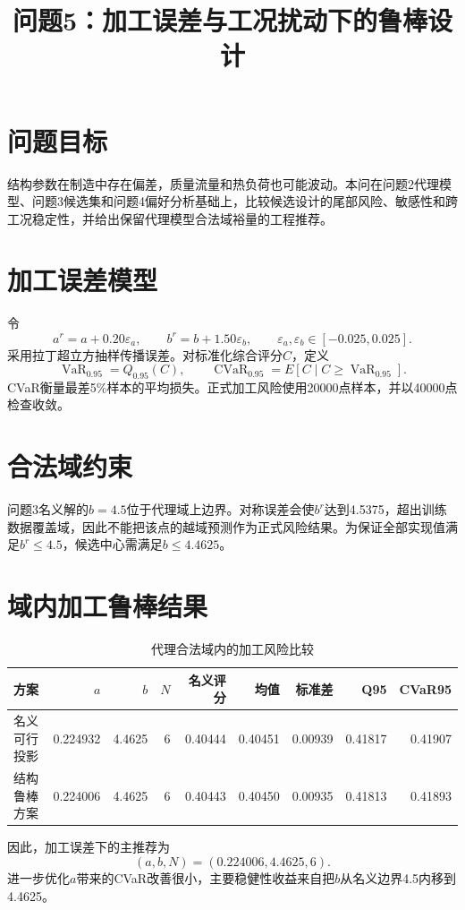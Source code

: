 \documentclass[UTF8,11pt,a4paper]{ctexart}
\title{问题5：加工误差与工况扰动下的鲁棒设计}
\author{}\date{}
\begin{document}
\maketitle

\section{问题目标}
结构参数在制造中存在偏差，质量流量和热负荷也可能波动。本问在问题2代理模型、问题3候选集和问题4偏好分析基础上，比较候选设计的尾部风险、敏感性和跨工况稳定性，并给出保留代理模型合法域裕量的工程推荐。

\section{加工误差模型}
令
\[
a^r=a+0.20\varepsilon_a,\qquad b^r=b+1.50\varepsilon_b,
\qquad \varepsilon_a,\varepsilon_b\in[-0.025,0.025].
\]
采用拉丁超立方抽样传播误差。对标准化综合评分$C$，定义
\[
\operatorname{VaR}_{0.95}=Q_{0.95}(C),\qquad
\operatorname{CVaR}_{0.95}=E[C\mid C\ge\operatorname{VaR}_{0.95}].
\]
CVaR衡量最差5\%样本的平均损失。正式加工风险使用20000点样本，并以40000点检查收敛。

\section{合法域约束}
问题3名义解的$b=4.5$位于代理域上边界。对称误差会使$b^r$达到4.5375，超出训练数据覆盖域，因此不能把该点的越域预测作为正式风险结果。为保证全部实现值满足$b^r\le4.5$，候选中心需满足$b\le4.4625$。

\section{域内加工鲁棒结果}
\begin{table}[H]\centering\small
\caption{代理合法域内的加工风险比较}
\begin{tabular}{lrrrrrrrr}\toprule
方案&$a$&$b$&$N$&名义评分&均值&标准差&Q95&CVaR95\\\midrule
名义可行投影&0.224932&4.4625&6&0.40444&0.40451&0.00939&0.41817&0.41907\\
结构鲁棒方案&0.224006&4.4625&6&0.40443&0.40450&0.00935&0.41813&0.41893\\\bottomrule
\end{tabular}
\end{table}
因此，加工误差下的主推荐为
\[
\boxed{(a,b,N)=(0.224006,4.4625,6)}.
\]
进一步优化$a$带来的CVaR改善很小，主要稳健性收益来自把$b$从名义边界4.5内移到4.4625。
\end{document}
